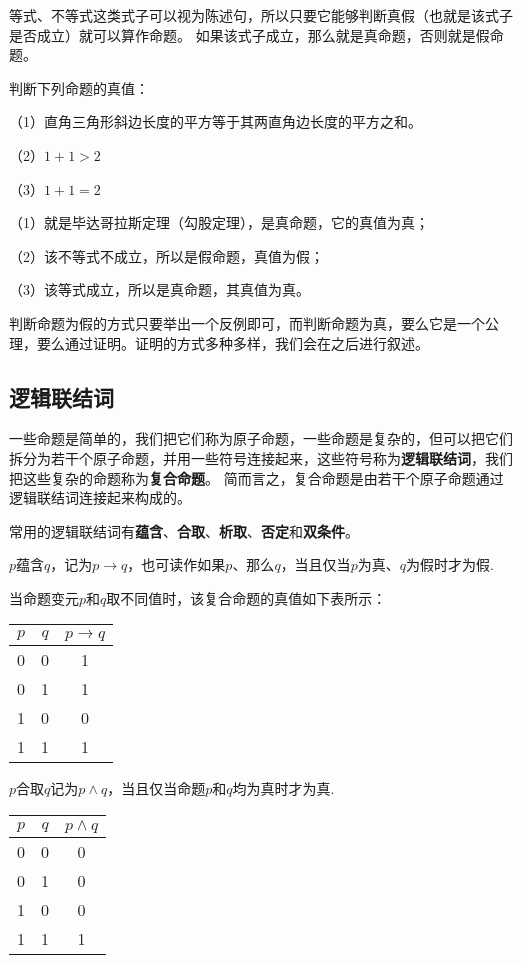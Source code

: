 等式、不等式这类式子可以视为陈述句，所以只要它能够判断真假（也就是该式子是否成立）就可以算作命题。
如果该式子成立，那么就是真命题，否则就是假命题。

\begin{example}
    判断下列命题的真值：

    （1）直角三角形斜边长度的平方等于其两直角边长度的平方之和。
    
    （2）$1+1>2$

    （3）$1+1=2$
\end{example}
\begin{solution}
    （1）就是毕达哥拉斯定理（勾股定理），是真命题，它的真值为真；
    
    （2）该不等式不成立，所以是假命题，真值为假；
    
    （3）该等式成立，所以是真命题，其真值为真。
\end{solution}

    判断命题为假的方式只要举出一个反例即可，而判断命题为真，要么它是一个公理，要么通过证明。证明的方式多种多样，我们会在之后进行叙述。

\subsection{逻辑联结词}
一些命题是简单的，我们把它们称为原子命题，一些命题是复杂的，但可以把它们拆分为若干个原子命题，并用一些符号连接起来，这些符号称为\textbf{逻辑联结词}，我们把这些复杂的命题称为\textbf{复合命题}。
简而言之，复合命题是由若干个原子命题通过逻辑联结词连接起来构成的。

常用的逻辑联结词有\textbf{蕴含}、\textbf{合取}、\textbf{析取}、\textbf{否定}和\textbf{双条件}。

\begin{definition}[蕴含]
    $p$蕴含$q$，记为$p \to q$，也可读作如果$p$、那么$q$，当且仅当$p$为真、$q$为假时才为假.
\end{definition}

当命题变元$p$和$q$取不同值时，该复合命题的真值如下表所示：

\begin{tabular}{c|c|c}
    $p$ & $q$ & $p \to q$ \\
    \hline
    0 & 0 & 1 \\
    0 & 1 & 1 \\
    1 & 0 & 0 \\
    1 & 1 & 1
\end{tabular}

\begin{definition}[合取]
    $p$合取$q$记为$p \wedge q$，当且仅当命题$p$和$q$均为真时才为真.
\end{definition}
\begin{tabular}{c|c|c}
    $p$ & $q$ & $p \wedge q$ \\
    \hline
    0 & 0 & 0 \\
    0 & 1 & 0 \\
    1 & 0 & 0 \\
    1 & 1 & 1
\end{tabular}


